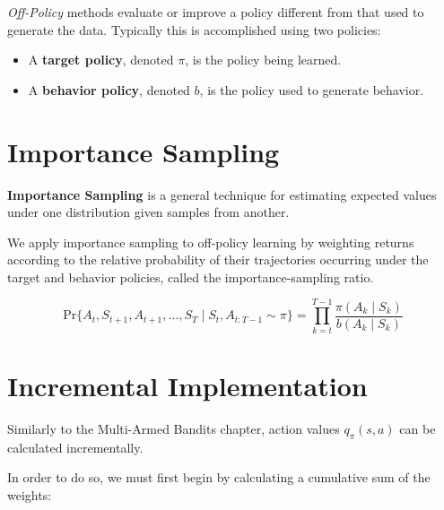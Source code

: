 \documentclass[
  letterpaper,
  DIV=11,
  numbers=noendperiod]{scrreprt}
\begin{document}
\begin{tcolorbox}[enhanced jigsaw, opacityback=0, left=2mm, breakable, bottomtitle=1mm, rightrule=.15mm, colframe=quarto-callout-tip-color-frame, titlerule=0mm, colback=white, opacitybacktitle=0.6, toptitle=1mm, title=\textcolor{quarto-callout-tip-color}{\faLightbulb}\hspace{0.5em}{Off-Policy Learning}, colbacktitle=quarto-callout-tip-color!10!white, bottomrule=.15mm, arc=.35mm, coltitle=black, leftrule=.75mm, toprule=.15mm]

\emph{Off-Policy} methods evaluate or improve a policy different from
that used to generate the data. Typically this is accomplished using two
policies:

\begin{itemize}
\item
  A \textbf{target policy}, denoted \(\pi\), is the policy being
  learned.
\item
  A \textbf{behavior policy}, denoted \(b\), is the policy used to
  generate behavior.
\end{itemize}

\end{tcolorbox}

\section{Importance Sampling}\label{importance-sampling}

\textbf{Importance Sampling} is a general technique for estimating
expected values under one distribution given samples from another.

We apply importance sampling to off-policy learning by weighting returns
according to the relative probability of their trajectories occurring
under the target and behavior policies, called the importance-sampling
ratio.

\[
\text{Pr}\{A_{t}, S_{t+1}, A_{t+1}, \dots , S_{T} \mid S_{t}, A_{t:T-1} \sim \pi \} = \prod_{k=t}^{T-1} \frac{\pi(A_{k} \mid S_{k})}{b(A_{k} \mid S_{k})}
\]

\section{Incremental Implementation}\label{incremental-implementation}

Similarly to the Multi-Armed Bandits chapter, action values
\(q_{\pi}(s,a)\) can be calculated incrementally.

In order to do so, we must first begin by calculating a cumulative sum
of the weights:
\end{document}
